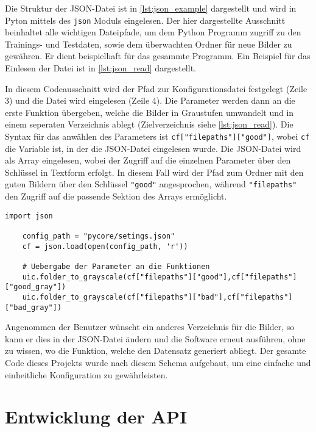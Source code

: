 Die Struktur der \ac{JSON}-Datei ist in \autoref{lst:json_example} dargestellt und wird in Pyton mittels des \texttt{json} Moduls eingelesen. Der hier dargestellte Ausschnitt beinhaltet alle wichtigen Dateipfade, um dem Python Programm zugriff zu den Trainings- und Testdaten, sowie dem überwachten Ordner für neue Bilder zu gewähren. Er dient beispielhaft für das gesammte Programm. Ein Beispiel für das Einlesen der Datei ist in \autoref{lst:json_read} dargestellt.

In diesem Codeausschnitt wird der Pfad zur Konfigurationsdatei festgelegt (Zeile 3) und die Datei wird eingelesen (Zeile 4). Die Parameter werden dann an die erste Funktion übergeben, welche die Bilder in Graustufen umwandelt und in einem seperaten Verzeichnis ablegt (Zielverzeichnis siehe \autoref{lst:json_read}). Die Syntax für das anwählen des Parameters ist \texttt{cf["filepaths"]["good"]}, wobei \texttt{cf} die Variable ist, in der die \ac{JSON}-Datei eingelesen wurde. Die \ac{JSON}-Datei wird als Array eingelesen, wobei der Zugriff auf die einzelnen Parameter über den Schlüssel in Textform erfolgt. In diesem Fall wird der Pfad zum Ordner mit den guten Bildern über den Schlüssel \texttt{"good"} angesprochen, während \texttt{"filepaths"} den Zugriff auf die passende Sektion des Arrays ermöglicht.


\begin{lstlisting}[style=python, label=lst:json_read, caption={Einlesen der \ac{JSON}-Datei}]
    import json

    config_path = "pycore/setings.json"
    cf = json.load(open(config_path, 'r'))

    # Uebergabe der Parameter an die Funktionen
    uic.folder_to_grayscale(cf["filepaths"]["good"],cf["filepaths"]["good_gray"])
    uic.folder_to_grayscale(cf["filepaths"]["bad"],cf["filepaths"]["bad_gray"])

\end{lstlisting}

Angenommen der Benutzer wünscht ein anderes Verzeichnis für die Bilder, so kann er dies in der \ac{JSON}-Datei ändern und die Software erneut ausführen, ohne zu wissen, wo die Funktion, welche den Datensatz generiert abliegt. 
Der gesamte Code dieses Projekts wurde nach diesem Schema aufgebaut, um eine einfache und einheitliche Konfiguration zu gewährleisten.

\section{Entwicklung der API} \label{subsec:entwicklung_der_api}

